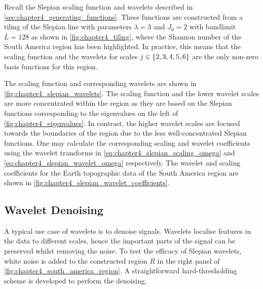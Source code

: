 Recall the Slepian scaling function and wavelets described in \cref{sec:chapter4_generating_functions}.
These functions are constructed from a tiling of the Slepian line with parameters \(\lambda=3\) and \(J_{0}=2\) with bandlimit \(L=128\) as shown in \cref{fig:chapter4_tiling}, where the Shannon number of the South America region has been highlighted.
In practice, this means that the scaling function and the wavelets for scales \(j \in \{2, 3, 4, 5, 6\}\) are the only non-zero basis functions for this region.

The scaling function and corresponding wavelets are shown in \cref{fig:chapter4_slepian_wavelets}.
The scaling function and the lower wavelet scales are more concentrated within the region as they are based on the Slepian functions corresponding to the eigenvalues on the left of \cref{fig:chapter4_eigenvalues}.
In contrast, the higher wavelet scales are focused towards the boundaries of the region due to the less well-concentrated Slepian functions.
One may calculate the corresponding scaling and wavelet coefficients using the wavelet transforms in \cref{eq:chapter4_slepian_scaling_omega} and \cref{eq:chapter4_slepian_wavelet_omega} respectively.
The wavelet and scaling coefficients for the Earth topographic data of the South America region are shown in \cref{fig:chapter4_slepian_wavelet_coefficients}.





\subsection{Wavelet Denoising}\label{sec:chapter4_wavelet_denoising}

A typical use case of wavelets is to denoise signals.
Wavelets localise features in the data to different scales, hence the important parts of the signal can be preserved whilst removing the noise.
To test the efficacy of Slepian wavelets, white noise is added to the constructed region \(R\) in the right panel of \cref{fig:chapter4_south_america_region}.
A straightforward hard-thresholding scheme is developed to perform the denoising.

